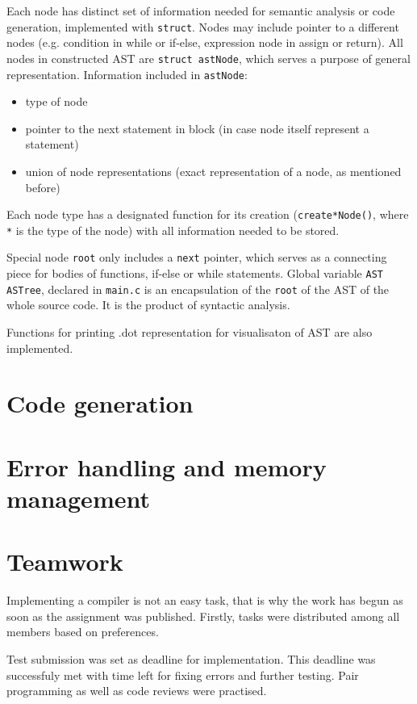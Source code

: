 \documentclass[a4paper, 11pt]{article}
\begin{document}
\par
Each node has distinct set of information needed for semantic analysis or code generation, implemented with
\verb|struct|. Nodes may include pointer to a different nodes (e.g. condition in while or if-else, expression node in assign or return).
All nodes in constructed AST are \verb|struct astNode|, which serves a purpose of general representation.
Information included in \verb|astNode|:
\begin{itemize}
    \item type of node
    \item pointer to the next statement in block (in case node itself represent a statement)
    \item union of node representations (exact representation of a node, as mentioned before)
\end{itemize}

Each node type has a designated function for its creation (\verb|create*Node()|, where \verb|*| is the type of the node)
with all information needed to be stored.
\par Special node \verb|root| only includes a \verb|next| pointer, which serves as a connecting piece for
bodies of functions, if-else or while statements. Global variable \verb|AST ASTree|, declared in \verb|main.c| is an
encapsulation of the \verb|root| of the AST of the whole source code. It is the product of syntactic analysis.
\par  Functions for printing .dot representation for visualisaton of AST are also implemented.

\section{Code generation}\label{sec:CODEGEN}

\section{Error handling and memory management}\label{sec:ERR}

\section{Teamwork}\label{sec:TEAM}
Implementing a compiler is not an easy task, that is why the work has begun as soon as 
the assignment was published. Firstly, tasks were distributed among all members based on 
preferences.\par 
Test submission was set as deadline for implementation. This deadline
was successfuly met with time left for fixing errors and further testing. Pair programming as well as 
code reviews were practised. 
\end{document}
